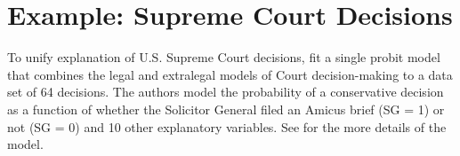 \documentclass[10pt]{article}
\begin{document}
\section*{Example: Supreme Court Decisions}

To unify explanation of U.S. Supreme Court decisions, \cite{GeorgeEpstein1992} fit a single probit model that combines the legal and extralegal models of Court decision-making to a data set of 64 decisions. 
The authors model the probability of a conservative decision as a function of whether the Solicitor General filed an Amicus brief (SG = 1) or not (SG = 0) and 10 other explanatory variables. 
See \cite{GeorgeEpstein1992} for the more details of the model.

\end{document}
